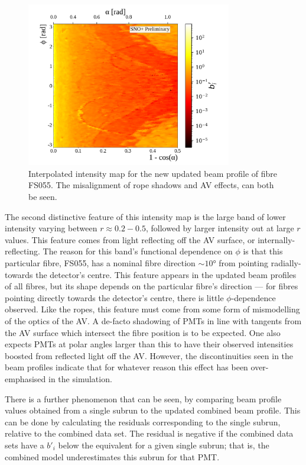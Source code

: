 \begin{figure}
    \centering
    \includegraphics[width=0.8\textwidth]{4_SMELLIESimulation/images/flat_plot_r_FS055_500k_interpolated_beam_profile_full_formatting.png}
    \caption[Interpolated intensity map for the new updated beam profile of fibre FS055]{Interpolated intensity map for the new updated beam profile of fibre FS055. The misalignment of rope shadows and AV effects, can both be seen.}
    \label{fig:updated_beam_profile_sampling}
\end{figure}
The second distinctive feature of this intensity map is the large band of lower intensity varying between $r\approx0.2-0.5$, followed by larger intensity out at large $r$ values. This feature comes from light reflecting off the AV surface, or internally-reflecting. The reason for this band's functional dependence on $\phi$ is that this particular fibre, FS055, has a nominal fibre direction $\sim\ang{10}$ from pointing radially-towards the detector's centre. This feature appears in the updated beam profiles of all fibres, but its shape depends on the particular fibre's direction --- for fibres pointing directly towards the detector's centre, there is little $\phi$-dependence observed. Like the ropes, this feature must come from some form of mismodelling of the optics of the AV. A de-facto shadowing of PMTs in line with tangents from the AV surface which intersect the fibre position is to be expected. One also expects PMTs at polar angles larger than this to have their observed intensities boosted from reflected light off the AV. However, the discontinuities seen in the beam profiles indicate that for whatever reason this effect has been over-emphasised in the simulation.

There is a further phenomenon that can be seen, by comparing beam profile values obtained from a single subrun to the updated combined beam profile. This can be done by calculating the residuals corresponding to the single subrun, relative to the combined data set. The residual is negative if the combined data sets have a $b'_{i}$ below the equivalent for a given single subrun; that is, the combined model underestimates this subrun for that PMT.

